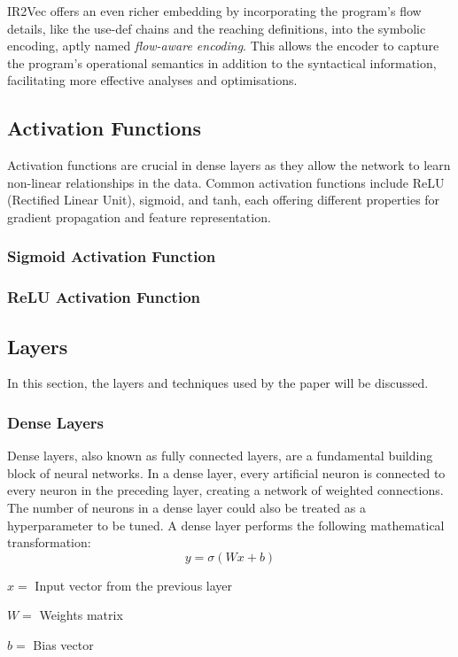 IR2Vec offers an even richer embedding by incorporating the program's flow details, like the use-def chains and the reaching definitions, into the symbolic encoding, aptly named \textit{flow-aware encoding}. This allows the encoder to capture the program's operational semantics in addition to the syntactical information, facilitating more effective analyses and optimisations. 

\subsection{Activation Functions}
Activation functions are crucial in dense layers as they allow the network to learn non-linear relationships in the data. Common activation functions include ReLU (Rectified Linear Unit), sigmoid, and tanh, each offering different properties for gradient propagation and feature representation.
\subsubsection{Sigmoid Activation Function}
\subsubsection{ReLU Activation Function}

\subsection{Layers}
In this section, the layers and techniques used by the paper will be discussed.
\subsubsection{Dense Layers}
Dense layers, also known as fully connected layers, are a fundamental building block of neural networks. In a dense layer, every artificial neuron is connected to every neuron in the preceding layer, creating a network of weighted connections. The number of neurons in a dense layer could also be treated as a hyperparameter to be tuned. A dense layer performs the following mathematical transformation:
$$y = \sigma(Wx+b)$$

\hspace{1cm}$x = $ Input vector from the previous layer

\hspace{1cm}$W = $ Weights matrix

\hspace{1cm}$b = $ Bias vector

